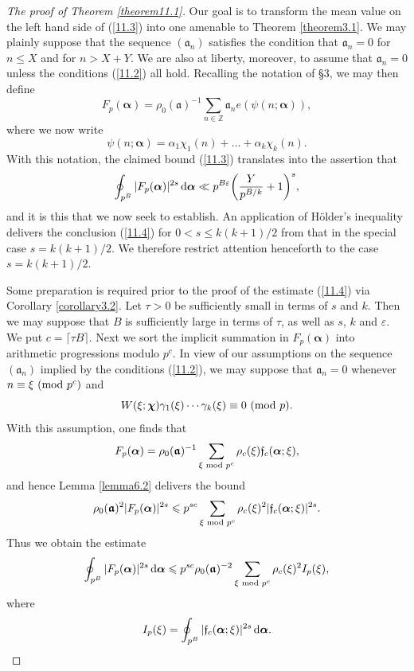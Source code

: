 \documentclass[12pt,reqno]{amsart}
\theoremstyle{definition}
\theoremstyle{remark}
\numberwithin{equation}{section}
\newcommand{\mmod}[1]{\,\,(\text{\rm mod}\,\,#1)}
\newcommand{\nmod}[1]{\,\,\text{\rm mod}\,\,#1}
\def\dbZ{{\mathbb Z}}\def\dbQ{{\mathbb Q}}
\def\gra{{\mathfrak a}}\def\grA{{\mathfrak A}}\def\bfgra{{\boldsymbol \gra}}
\def\grf{{\mathfrak f}}\def\grF{{\mathfrak F}}
\def\alp{{\alpha}} \def\bfalp{{\boldsymbol \alpha}}
\def\gam{{\gamma}} \def\Gam{{\Gamma}}
\def\bfchi{{\boldsymbol \chi}}
\def\eps{\varepsilon}
\def\le{\leqslant} \def\ge{\geqslant} \def\pleq{\preccurlyeq} \def\ple{\prec}
\def\d{{\,{\rm d}}}
\begin{document}
\begin{proof}[The proof of Theorem \ref{theorem11.1}] Our goal is to transform the mean 
value on the left hand side of (\ref{11.3}) into one amenable to Theorem \ref{theorem3.1}. 
We may plainly suppose that the sequence $(\gra_n)$ satisfies the condition that 
$\gra_n=0$ for $n\le X$ and for $n>X+Y$. We are also at liberty, moreover, to assume that 
$\gra_n=0$ unless the conditions (\ref{11.2}) all hold. Recalling the notation of \S3, we may 
then define
$$F_p(\bfalp)=\rho_0(\bfgra)^{-1}\sum_{n\in \dbZ}\gra_n e(\psi(n;\bfalp)),$$
where we now write
$$\psi(n;\bfalp)=\alp_1\chi_1(n)+\ldots +\alp_k\chi_k(n).$$
With this notation, the claimed bound (\ref{11.3}) translates into the assertion that
\begin{equation}\label{11.4}
\oint_{p^B}|F_p(\bfalp)|^{2s}\d\bfalp \ll p^{B\eps}\biggl( \frac{Y}{p^{B/k}}+1\biggr)^s,
\end{equation}
and it is this that we now seek to establish. An application of H\"older's inequality delivers 
the conclusion (\ref{11.4}) for $0<s\le k(k+1)/2$ from that in the special case 
$s=k(k+1)/2$. We therefore restrict attention henceforth to the case $s=k(k+1)/2$.\par

Some preparation is required prior to the proof of the estimate (\ref{11.4}) via Corollary 
\ref{corollary3.2}. Let $\tau>0$ be sufficiently small in terms of $s$ and $k$. Then we may 
suppose that $B$ is sufficiently large in terms of $\tau$, as well as $s$, $k$ and $\eps$. We 
put $c=\lceil \tau B\rceil$. Next we sort the implicit summation in $F_p(\bfalp)$ into 
arithmetic progressions modulo $p^c$. In view of our assumptions on the sequence 
$(\gra_n)$ implied by the conditions (\ref{11.2}), we may suppose that $\gra_n=0$ 
whenever $n\equiv \xi\mmod{p^c}$ and
$$W(\xi;\bfchi)\gam_1(\xi)\cdots \gam_k(\xi) \equiv 0\mmod{p}.$$
With this assumption, one finds that
$$F_p(\bfalp)=\rho_0(\bfgra)^{-1}\sum_{\xi\nmod{p^c}}\rho_c(\xi)\grf_c(\bfalp;\xi),$$
and hence Lemma \ref{lemma6.2} delivers the bound
$$\rho_0(\bfgra)^2|F_p(\bfalp)|^{2s}\le p^{sc}\sum_{\xi\nmod{p^c}}\rho_c(\xi)^2
|\grf_c(\bfalp;\xi)|^{2s}.$$
Thus we obtain the estimate
\begin{equation}\label{11.5}
\oint_{p^B}|F_p(\bfalp)|^{2s}\d\bfalp \le p^{sc}\rho_0(\bfgra)^{-2}
\sum_{\xi\nmod{p^c}}\rho_c(\xi)^2I_p(\xi),
\end{equation}
where
$$I_p(\xi)=\oint_{p^B}|\grf_c(\bfalp;\xi)|^{2s}\d\bfalp .$$


\end{proof}
\end{document}
